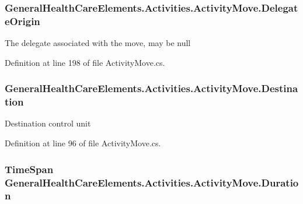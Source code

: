 \subsubsection[{\texorpdfstring{Delegate\+Origin}{DelegateOrigin}}]{ General\+Health\+Care\+Elements.\+Activities.\+Activity\+Move.\+Delegate\+Origin\hspace{0.3cm}{\ttfamily [get]}}\hypertarget{class_general_health_care_elements_1_1_activities_1_1_activity_move_ae6324b704709d38fadb084dadf0a6638}{}\label{class_general_health_care_elements_1_1_activities_1_1_activity_move_ae6324b704709d38fadb084dadf0a6638}


The delegate associated with the move, may be null 



Definition at line 198 of file Activity\+Move.\+cs.

\subsubsection[{\texorpdfstring{Destination}{Destination}}]{ General\+Health\+Care\+Elements.\+Activities.\+Activity\+Move.\+Destination\hspace{0.3cm}{\ttfamily [get]}}\hypertarget{class_general_health_care_elements_1_1_activities_1_1_activity_move_ae22a76593f52229d574401811e5863d8}{}\label{class_general_health_care_elements_1_1_activities_1_1_activity_move_ae22a76593f52229d574401811e5863d8}


Destination control unit 



Definition at line 96 of file Activity\+Move.\+cs.

\subsubsection[{\texorpdfstring{Duration}{Duration}}]{\setlength{\rightskip}{0pt plus 5cm}Time\+Span General\+Health\+Care\+Elements.\+Activities.\+Activity\+Move.\+Duration\hspace{0.3cm}{\ttfamily [get]}}\hypertarget{class_general_health_care_elements_1_1_activities_1_1_activity_move_af759c4886cdab10fbc7682b7ce9db513}{}\label{class_general_health_care_elements_1_1_activities_1_1_activity_move_af759c4886cdab10fbc7682b7ce9db513}


